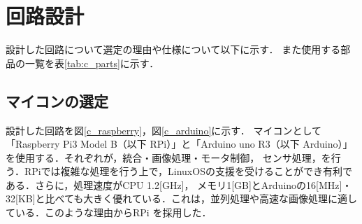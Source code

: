 \documentclass[10pt,a4j]{ujarticle}
\begin{document}
\section{回路設計}
設計した回路について選定の理由や仕様について以下に示す．
また使用する部品の一覧を表\ref{tab:c_parts}に示す．

\subsection{マイコンの選定}
設計した回路を図\ref{c_raspberry}，図\ref{c_arduino}に示す．
マイコンとして「Raspberry Pi3 Model B（以下 RPi）」と「Arduino uno R3（以下 Arduino）」を使用する．それぞれが，統合・画像処理・モータ制御，
センサ処理，を行う．RPiでは複雑な処理を行う上で，LinuxOSの支援を受けることができ有利である．さらに，処理速度がCPU 1.2[GHz]，
メモリ1[GB]とArduinoの16[MHz]・32[KB]と比べても大きく優れている．これは，並列処理や高速な画像処理に適している．このような理由からRPi
を採用した．
\end{document}
